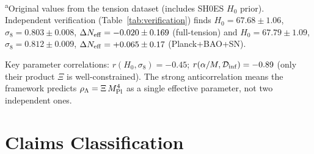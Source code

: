 \documentclass[aps,prd,twocolumn,superscriptaddress,showpacs,preprintnumbers,
  nofootinbib,longbibliography,floatfix]{revtex4-2}
\newcommand{\Dinf}{\mathcal{D}_{\rm inf}}
\newcommand{\MPl}{M_{\rm Pl}}
\newcommand{\Neff}{N_{\rm eff}}
\begin{document}
\textsuperscript{a}Original values from the tension dataset (includes
SH0ES $H_0$ prior). Independent verification
(Table~\ref{tab:verification}) finds $H_0 = 67.68 \pm 1.06$,
$\sigma_8 = 0.803 \pm 0.008$, $\Delta\Neff = -0.020 \pm 0.169$
(full-tension) and $H_0 = 67.79 \pm 1.09$,
$\sigma_8 = 0.812 \pm 0.009$, $\Delta\Neff = +0.065 \pm 0.17$
(Planck+BAO+SN).

Key parameter correlations: $r(H_0,\sigma_8)=-0.45$;
$r(\alpha/M,\Dinf)=-0.89$ (only their product $\Xi$ is
well-constrained). The strong anticorrelation means the framework
predicts $\rho_\Lambda = \Xi\,\MPl^4$ as a single effective
parameter, not two independent ones.


\section{Claims Classification}\label{app:claims}
\end{document}
